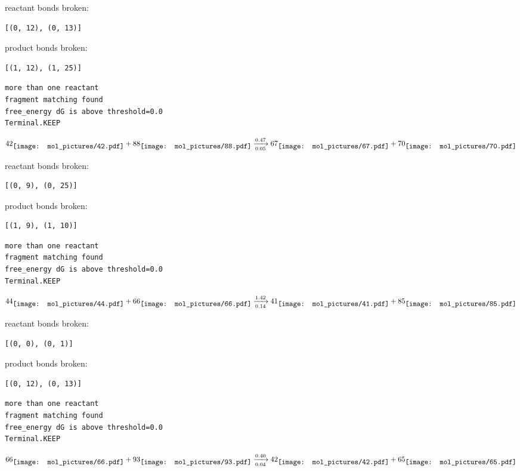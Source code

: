\documentclass{article}
\begin{document}
reactant bonds broken:\begin{verbatim}
[(0, 12), (0, 13)]
\end{verbatim}
product bonds broken:\begin{verbatim}
[(1, 12), (1, 25)]
\end{verbatim}




\vspace{1cm}
\begin{verbatim}
more than one reactant
fragment matching found
free_energy dG is above threshold=0.0
Terminal.KEEP
\end{verbatim}
$$
42
\raisebox{-.5\height}{\texttt{[image: mol\_pictures/42.pdf]}}
+
88
\raisebox{-.5\height}{\texttt{[image: mol\_pictures/88.pdf]}}
\xrightarrow[0.05]{0.47}
67
\raisebox{-.5\height}{\texttt{[image: mol\_pictures/67.pdf]}}
+
70
\raisebox{-.5\height}{\texttt{[image: mol\_pictures/70.pdf]}}
$$


reactant bonds broken:\begin{verbatim}
[(0, 9), (0, 25)]
\end{verbatim}
product bonds broken:\begin{verbatim}
[(1, 9), (1, 10)]
\end{verbatim}




\vspace{1cm}
\begin{verbatim}
more than one reactant
fragment matching found
free_energy dG is above threshold=0.0
Terminal.KEEP
\end{verbatim}
$$
44
\raisebox{-.5\height}{\texttt{[image: mol\_pictures/44.pdf]}}
+
66
\raisebox{-.5\height}{\texttt{[image: mol\_pictures/66.pdf]}}
\xrightarrow[0.14]{1.42}
41
\raisebox{-.5\height}{\texttt{[image: mol\_pictures/41.pdf]}}
+
85
\raisebox{-.5\height}{\texttt{[image: mol\_pictures/85.pdf]}}
$$


reactant bonds broken:\begin{verbatim}
[(0, 0), (0, 1)]
\end{verbatim}
product bonds broken:\begin{verbatim}
[(0, 12), (0, 13)]
\end{verbatim}




\vspace{1cm}
\begin{verbatim}
more than one reactant
fragment matching found
free_energy dG is above threshold=0.0
Terminal.KEEP
\end{verbatim}
$$
66
\raisebox{-.5\height}{\texttt{[image: mol\_pictures/66.pdf]}}
+
93
\raisebox{-.5\height}{\texttt{[image: mol\_pictures/93.pdf]}}
\xrightarrow[0.04]{0.40}
42
\raisebox{-.5\height}{\texttt{[image: mol\_pictures/42.pdf]}}
+
65
\raisebox{-.5\height}{\texttt{[image: mol\_pictures/65.pdf]}}
$$
\end{document}
